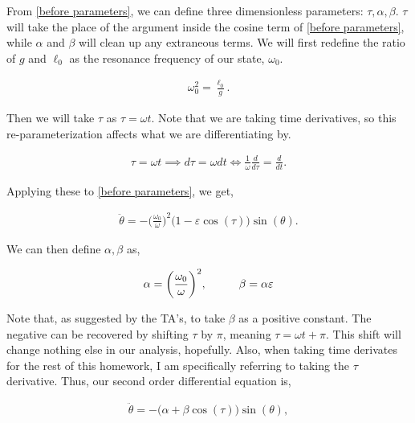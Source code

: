 \documentclass[12pt]{article}
\newcommand{\ep}{\varepsilon}
\begin{document}
\begin{enumerate}[]
\begin{solution}
        From \ref{before parameters}, we can define three dimensionless parameters: $\tau, \alpha, \beta$. $\tau$ will take the place of the argument inside the cosine term of \ref{before parameters}, while $\alpha$ and $\beta$ will clean up any extraneous terms. We will first redefine the ratio of $g$ and $\ell_0$ as the resonance frequency of our state, $\omega_0$.
        
        \begin{align*}
            \omega_0^2 = \frac{\ell_0}{g}.    
        \end{align*}

        Then we will take $\tau$ as $\tau = \omega t$. Note that we are taking time derivatives, so this re-parameterization affects what we are differentiating by. 

        \begin{align*}
            \tau = \omega t \implies d\tau = \omega dt \iff \frac{1}{\omega}\frac{d}{d\tau} = \frac{d}{dt}.
        \end{align*}

        Applying these to \ref{before parameters}, we get,

        \begin{align}
            \ddot{\theta} = -\Big(\frac{\omega_0}{\omega} \Big)^2 \big( 1 - \ep \cos(\tau) \big) \sin(\theta).  \label{before alphabeta}
        \end{align}

        We can then define $\alpha, \beta$ as,

        \begin{align}
            \alpha = \bigg(\frac{\omega_0}{\omega}\bigg)^2, \hspace{10mm} \beta = \alpha\ep
        \end{align}

        Note that, as suggested by the TA's, to take $\beta$ as a positive constant. The negative can be recovered by shifting $\tau$ by $\pi$, meaning $\tau = \omega t + \pi$. This shift will change nothing else in our analysis, hopefully. Also, when taking time derivates for the rest of this homework, I am specifically referring to taking the $\tau$ derivative. Thus, our second order differential equation is, 

        \begin{align}
            \ddot{\theta} = -\big(\alpha + \beta \cos(\tau)\big)\sin(\theta),   \label{second order ode with new parameters}
        \end{align}


\end{solution}
\end{enumerate}
\end{document}
